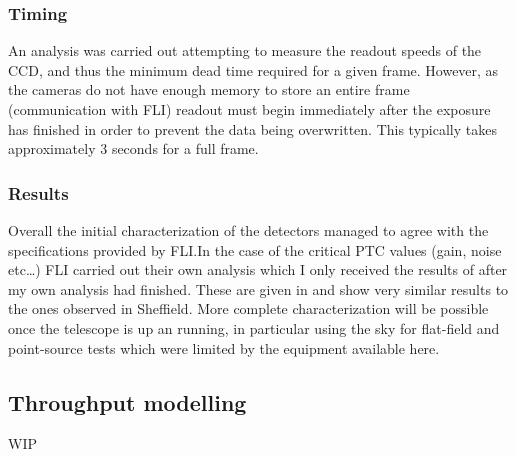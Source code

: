 \begin{colsection}
\begin{colsection}
\subsubsection{Timing}
An analysis was carried out attempting to measure the readout speeds of the CCD, and thus the minimum dead time required for a given frame. However, as the cameras do not have enough memory to store an entire frame (communication with FLI) readout must begin immediately after the exposure has finished in order to prevent the data being overwritten. This typically takes approximately 3 seconds for a full frame.

\newpage
\subsubsection{Results}

Overall the initial characterization of the detectors managed to agree with the specifications provided by FLI.\@ In the case of the critical PTC values (gain, noise etc\ldots) FLI carried out their own analysis which I only received the results of after my own analysis had finished. These are given in  and show very similar results to the ones observed in Sheffield. More complete characterization will be possible once the telescope is up an running, in particular using the sky for flat-field and point-source tests which were limited by the equipment available here.

\end{colsection}

\newpage
\subsection{Throughput modelling}
\label{sec:throughput}
\begin{colsection}

WIP

\end{colsection}


\end{colsection}


\newpage
